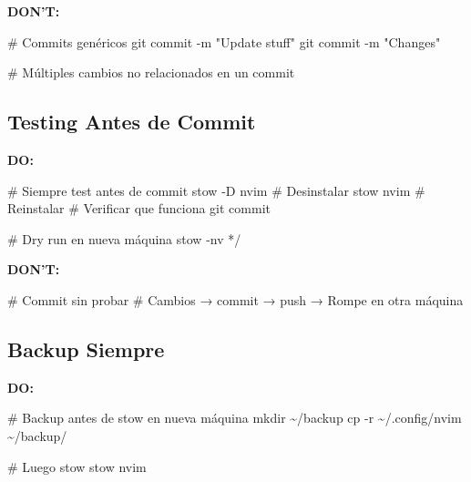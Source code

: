 \documentclass[
  doc,
  floatsintext,
  longtable,
  a4paper,
  nolmodern,
  notxfonts,
  notimes,
  12pt,
  colorlinks=true,linkcolor=blue,citecolor=blue,urlcolor=blue]{apa7}
\newenvironment{Shaded}{\begin{snugshade}}{\end{snugshade}}
\newcommand{\AttributeTok}[1]{\textcolor[rgb]{0.40,0.45,0.13}{#1}}
\newcommand{\CommentTok}[1]{\textcolor[rgb]{0.37,0.37,0.37}{#1}}
\newcommand{\ExtensionTok}[1]{\textcolor[rgb]{0.00,0.23,0.31}{#1}}
\newcommand{\FunctionTok}[1]{\textcolor[rgb]{0.28,0.35,0.67}{#1}}
\newcommand{\NormalTok}[1]{\textcolor[rgb]{0.00,0.23,0.31}{#1}}
\newcommand{\PreprocessorTok}[1]{\textcolor[rgb]{0.68,0.00,0.00}{#1}}
\newcommand{\StringTok}[1]{\textcolor[rgb]{0.13,0.47,0.30}{#1}}
\begin{document}
\textbf{DON'T:}

\begin{Shaded}
\begin{Highlighting}[]
\CommentTok{\# Commits genéricos}
\FunctionTok{git}\NormalTok{ commit }\AttributeTok{{-}m} \StringTok{"Update stuff"}
\FunctionTok{git}\NormalTok{ commit }\AttributeTok{{-}m} \StringTok{"Changes"}

\CommentTok{\# Múltiples cambios no relacionados en un commit}
\end{Highlighting}
\end{Shaded}

\subsection{Testing Antes de Commit}\label{testing-antes-de-commit}

\textbf{DO:}

\begin{Shaded}
\begin{Highlighting}[]
\CommentTok{\# Siempre test antes de commit}
\ExtensionTok{stow} \AttributeTok{{-}D}\NormalTok{ nvim  }\CommentTok{\# Desinstalar}
\ExtensionTok{stow}\NormalTok{ nvim     }\CommentTok{\# Reinstalar}
\CommentTok{\# Verificar que funciona}
\FunctionTok{git}\NormalTok{ commit}

\CommentTok{\# Dry run en nueva máquina}
\ExtensionTok{stow} \AttributeTok{{-}nv} \PreprocessorTok{*}\NormalTok{/}
\end{Highlighting}
\end{Shaded}

\textbf{DON'T:}

\begin{Shaded}
\begin{Highlighting}[]
\CommentTok{\# Commit sin probar}
\CommentTok{\# Cambios → commit → push → Rompe en otra máquina}
\end{Highlighting}
\end{Shaded}

\subsection{Backup Siempre}\label{backup-siempre}

\textbf{DO:}

\begin{Shaded}
\begin{Highlighting}[]
\CommentTok{\# Backup antes de stow en nueva máquina}
\FunctionTok{mkdir}\NormalTok{ \textasciitilde{}/backup}
\FunctionTok{cp} \AttributeTok{{-}r}\NormalTok{ \textasciitilde{}/.config/nvim \textasciitilde{}/backup/}

\CommentTok{\# Luego stow}
\ExtensionTok{stow}\NormalTok{ nvim}
\end{Highlighting}
\end{Shaded}
\end{document}
